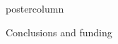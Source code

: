 \documentclass[final]{beamer}\usepackage[]{graphicx}\usepackage[]{color}
\begin{document}
\begin{frame}
\begin{columns}
\begin{column}{.50\textwidth}
\begin{beamercolorbox}[center,wd=\textwidth]{postercolumn}
\begin{minipage}[T]{.95\textwidth}
{\begin{block}{Conclusions and funding}
    \end{block}
    \vfill 
    
        
     
    


}
\end{minipage}
\end{beamercolorbox}
\end{column}
\end{columns}  
\end{frame}
\end{document}
